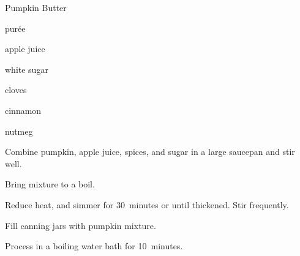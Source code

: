 \begin{recipe}{Pumpkin Butter}{}{}

\begin{ingredients}
\item \C{3\threequarter}  pur\'ee
\item \C{\threequarter} apple juice
\item \C{1\half} white sugar
\item {} 
\item \tp{\half} cloves
\item {} cinnamon
\item {} nutmeg
\end{ingredients}

\begin{directions}
\item Combine pumpkin, apple juice, spices, and sugar in a large saucepan and stir well.
\item Bring mixture to a boil. 
\item Reduce heat, and simmer for 30~minutes or until thickened. Stir frequently.
\item Fill canning jars with pumpkin mixture.
\item Process in a boiling water bath for 10~minutes.
\end{directions}
\end{recipe}
